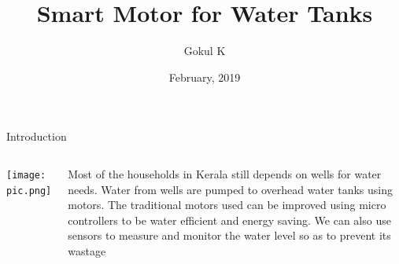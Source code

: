 \documentclass{beamer}
\begin{document}
\title{Smart Motor for Water Tanks}
\author{Gokul K}
\date{February, 2019}

\begin{frame}

    \titlepage
\end{frame}

    \begin{frame}{Introduction}

        \begin{columns}
                \texttt{[image: pic.png]}
                
               Most of the households in Kerala still depends on wells for water needs. Water from wells are pumped to overhead water tanks using motors. The traditional motors used can be improved using micro controllers to be water efficient and energy saving. We can also use sensors to measure and monitor the water level so as to prevent its wastage
                
        \end{columns}
    \end{frame}
    
\end{document}
